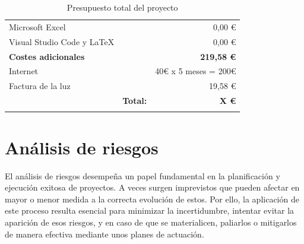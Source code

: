 \begin{longtable}[c]{lm{2cm}r}
Microsoft Excel                         && 0,00 €             \\
Visual Studio Code y LaTeX              && 0,00 €             \\
\midrule
\textbf{Costes adicionales}             && \textbf{219,58 €}  \\
Internet                                && 40€ x 5 meses = 200€           \\
Factura de la luz                       && 19,58 €            \\
\midrule
  &   \multicolumn{1}{r}{\textbf{Total:}} & \textbf{X €} \\
\bottomrule
\caption{Presupuesto total del proyecto}
\label{tabla:presupuesto_total}
\end{longtable}


\section{Análisis de riesgos} \label{riesgos}
El análisis de riesgos desempeña un papel fundamental en la planificación y ejecución exitosa de proyectos. A veces surgen imprevistos que pueden afectar en mayor o menor medida a la correcta evolución de estos. Por ello, la aplicación de este proceso resulta esencial para minimizar la incertidumbre, intentar evitar la aparición de esos riesgos, y en caso de que se materialicen, paliarlos o mitigarlos de manera efectiva mediante unos planes de actuación.

